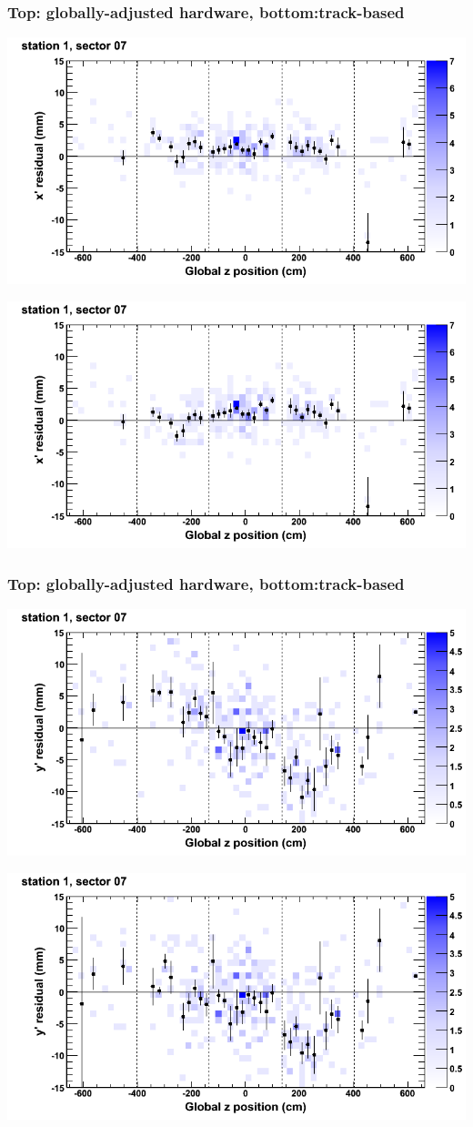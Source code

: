 \documentclass[compress]{beamer}
\begin{document}
\begin{frame}
\frametitle{Top: globally-adjusted hardware, bottom:track-based}
\includegraphics[width=0.7\linewidth]{NOV4_mapplots_HW/DTvsz_st1sec07_x.png}

\includegraphics[width=0.7\linewidth]{NOV4_mapplots/DTvsz_st1sec07_x.png}
\end{frame}

\begin{frame}
\frametitle{Top: globally-adjusted hardware, bottom:track-based}
\includegraphics[width=0.7\linewidth]{NOV4_mapplots_HW/DTvsz_st1sec07_y.png}

\includegraphics[width=0.7\linewidth]{NOV4_mapplots/DTvsz_st1sec07_y.png}
\end{frame}
\end{document}
